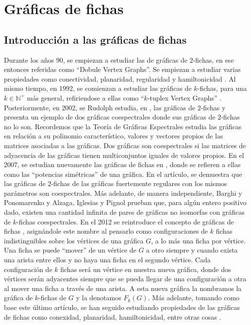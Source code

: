 \chapter{Gr\'aficas de fichas}%
\label{cap:fichass}

\section{Introducci\'on a las gr\'aficas de fichas}%
\label{sec:intro-fichas}


Durante los a\~{n}os 90, se empiezan a estudiar las de gr\'aficas de $2$-fichas,
en ese entonces referidas como ``Dobule Vertex Graphs''. Se empiezan a estudiar
varias propiedades como conectividad, planaridad, regularidad y hamiltonicidad
\cite{alaviPlanarity, alaviDVGraphs, alaviHamilt, zhuConnect}. Al mismo tiempo,
en 1992, se comienzan a estudiar las gr\'aficas de $k$-fichas, para una $k \in
\mathbb{N^{+}}$ m\'as general, refiriendose a ellas como ``$k$-tuplex Vertex
Graphs'' \cite{zhuNTuples}. Posteriormente, en 2002, se Rudolph estudia, en
\cite{rudolphGInv}, las gr\'aficas de $2$-fichas y presenta un ejemplo de dos
gr\'aficas coespectrales donde sus gr\'aficas de $2$-fichas no lo son.
Recordemos que la Teor\'ia de Gr\'aficas Espectrales estudia las gr\'aficas en
relaci\'on a su polinomio caracter\'istico, valores y vectores propios de las
matrices asociadas a las gr\'aficas. Dos gr\'aficas son coespectrales si las
matrices de adyacencia de las gr\'aficas tienen multiconjuntos iguales de
valores propios. En el 2007, se estudian nuevamente las gr\'aficas de fichas en
\cite{audeanetSymPower}, donde se refieren a ellas como las ``potencias
sim\'etricas'' de una gr\'afica. En el art\'iculo, se demuestra que las
gr\'aficas de $2$-fichas de las gr\'aficas fuertemente regulares con los mismos
par\'ametros son coespectrales. M\'as adelante, de manera independiente, Barghi
y Ponomarenko \cite{barghi-ponomarenko} y Alzaga, Iglesias y Pignol
\cite{alzagaSymPower} prueban que, para alg\'un entero positivo dado, existen
una cantidad infinita de pares de gr\'aficas no isomorfas con gr\'aficas de
$k$-fichas coespectrales. En el 2012 se reintroduce el concepto de gr\'aficas de
fichas \cite{fabilaToken}, asign\'andole este nombre al pensarlo como
configuraciones de $k$ fichas indistinguibles sobre los v\'ertices de una
gr\'afica $G$, a lo m\'as una ficha por v\'ertice. Una ficha se puede ``mover''
de un v\'ertice de $G$ a otro siempre y cuando exista una arista entre ellos y
no haya una ficha en el segundo v\'ertice. Cada configuraci\'on de $k$ fichas
ser\'a un v\'ertice en nuestra nueva gr\'afica, donde dos v\'ertices ser\'an
adyacentes siempre que se pueda llegar de una configuraci\'on a otra al mover
una ficha a trav\'es de una arista. A esta nueva gr\'afica la nombramos la
gr\'afica de $k$-fichas de $G$ y la denotamos $F_k(G)$. M\'as adelante, tomando
como base este \'ultimo art\'iculo, se han seguido estudiando propiedades de las
gr\'aficas de fichas como conexidad, planaridad, hamiltonicidad, entre otras
cosas \cite{carballosaRegPlan, leaConnect, riveraHamilt, adameHamilt,
leaEConnect}.

